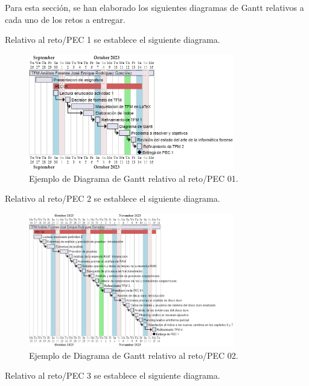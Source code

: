 Para esta sección, se han elaborado los siguientes diagramas de Gantt relativos a cada uno de los retos a entregar.

\noindent Relativo al reto/PEC 1 se establece el siguiente diagrama.

\begin{figure}[htp]
    \centering
    \includegraphics[width=0.8\textwidth]{imagenes/003-diagrama-de-gantt-pec-01.png}
    \caption{Ejemplo de Diagrama de Gantt relativo al reto/PEC 01.}
    \label{fig:Diagrama de Gantt PEC 1}
\end{figure}

\clearpage

\noindent Relativo al reto/PEC 2 se establece el siguiente diagrama.

\begin{figure}[htp]
    \centering
    \includegraphics[width=0.8\textwidth]{imagenes/004-diagrama-de-gantt-pec-02.png}
    \caption{Ejemplo de Diagrama de Gantt relativo al reto/PEC 02.}
    \label{fig:Diagrama de Gantt PEC 2}
\end{figure}

\clearpage

\noindent Relativo al reto/PEC 3 se establece el siguiente diagrama.

